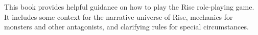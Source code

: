 \documentclass[twocolumn,oneside,letterpaper]{book} %
\begin{document}
\tableofcontents

This book provides helpful guidance on how to play the Rise role-playing game.
It includes some context for the narrative universe of Rise, mechanics for monsters and other antagonists, and clarifying rules for special circumstances.









\appendix
\end{document}

